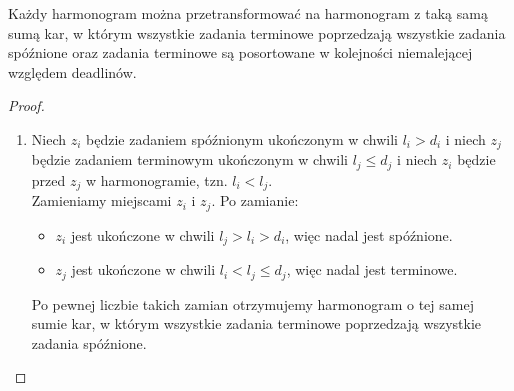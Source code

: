 \begin{lemma}
	Każdy harmonogram można przetransformować na harmonogram z taką samą sumą kar, w którym wszystkie zadania terminowe poprzedzają wszystkie zadania spóźnione oraz zadania terminowe są posortowane w kolejności niemalejącej względem deadlinów.
\end{lemma}
\begin{proof}~
	\begin{enumerate}
		\item Niech $z_i$ będzie zadaniem spóźnionym ukończonym w chwili $l_i > d_i$ i niech $z_j$ będzie zadaniem terminowym ukończonym w chwili $l_j \leq d_j$ i niech $z_i$ będzie przed $z_j$ w harmonogramie, tzn. $l_i < l_j$.\\
		      Zamieniamy miejscami $z_i$ i $z_j$. Po zamianie:
		      \begin{itemize}[nosep]
			      \item $z_i$ jest ukończone w chwili $l_j > l_i > d_i$, więc nadal jest spóźnione.
			      \item $z_j$ jest ukończone w chwili $l_i < l_j \leq d_j$, więc nadal jest terminowe.
		      \end{itemize}
		      Po pewnej liczbie takich zamian otrzymujemy harmonogram o tej samej sumie kar, w którym wszystkie zadania terminowe poprzedzają wszystkie zadania spóźnione.


\end{enumerate}
\end{proof}
